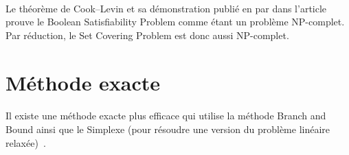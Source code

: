 \documentclass[12pt,letterpaper,twoside]{article}
\begin{document}
		\paragraph*{}
			Le théorème de Cook–Levin et sa démonstration publié en \citeyear{Cook1971} par \citeauthor{Cook1971} dans l'article \cite{Cook1971} prouve le Boolean Satisfiability Problem comme étant un problème NP-complet. Par réduction, le Set Covering Problem est donc aussi NP-complet.
	\section{Méthode exacte}
		\paragraph*{}
			Il existe une méthode exacte plus efficace qui utilise la méthode Branch and Bound ainsi que le Simplexe (pour résoudre une version
			du problème linéaire relaxée)~\cite{caprara2000algorithms}.

	\newpage\printbibliography[heading=bibintoc]{}
\end{document}
